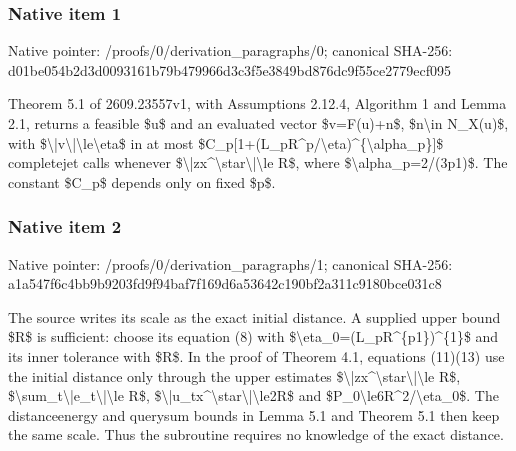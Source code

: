 \documentclass[10pt,a4paper]{article}
\begin{document}
\subsubsection{Native item 1}


Native pointer: /proofs/0/derivation\_paragraphs/0; canonical SHA-256: d01be054b2d3d0093161b79b\allowbreak{}479966d3c3f5e3849bd876dc\allowbreak{}9f55ce2779ecf095


Theorem 5.1 of 2609.23557v1, with Assumptions 2.12.4, Algorithm 1 and Lemma 2.1, returns a feasible \$u\$ and an evaluated vector \$v=F(u)+n\$, \$n\textbackslash{}in N\_X(u)\$, with \$\textbackslash{}|v\textbackslash{}|\textbackslash{}le\textbackslash{}eta\$ in at most \$C\_p[1+(L\_pR\textasciicircum{}p/\textbackslash{}eta)\textasciicircum{}\{\textbackslash{}alpha\_p\}]\$ completejet calls whenever \$\textbackslash{}|zx\textasciicircum{}\textbackslash{}star\textbackslash{}|\textbackslash{}le R\$, where \$\textbackslash{}alpha\_p=2/(3p1)\$. The constant \$C\_p\$ depends only on fixed \$p\$.


\subsubsection{Native item 2}


Native pointer: /proofs/0/derivation\_paragraphs/1; canonical SHA-256: a1a547f6c4bb9b9203fd9f94\allowbreak{}baf7f169d6a53642c190bf2a\allowbreak{}311c9180bce031c8


The source writes its scale as the exact initial distance. A supplied upper bound \$R\$ is sufficient: choose its equation (8) with \$\textbackslash{}eta\_0=(L\_pR\textasciicircum{}\{p1\})\textasciicircum{}\{1\}\$ and its inner tolerance with \$R\$. In the proof of Theorem 4.1, equations (11)(13) use the initial distance only through the upper estimates \$\textbackslash{}|zx\textasciicircum{}\textbackslash{}star\textbackslash{}|\textbackslash{}le R\$, \$\textbackslash{}sum\_t\textbackslash{}|e\_t\textbackslash{}|\textbackslash{}le R\$, \$\textbackslash{}|u\_tx\textasciicircum{}\textbackslash{}star\textbackslash{}|\textbackslash{}le2R\$ and \$P\_0\textbackslash{}le6R\textasciicircum{}2/\textbackslash{}eta\_0\$. The distanceenergy and querysum bounds in Lemma 5.1 and Theorem 5.1 then keep the same scale. Thus the subroutine requires no knowledge of the exact distance.
\end{document}
